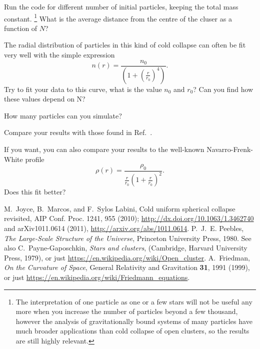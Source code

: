\documentclass[11pt,a4wide]{article}
\begin{document}
\begin{enumerate}
Run the code for different number of initial particles, keeping the
total mass constant. \footnote{The interpretation of one particle as one or a few stars will not be useful any more when you increase the number of particles beyond a few thousand, however the analysis of gravitationally bound systems of many particles have much broader applications than cold collapse of open clusters, so the results are still highly relevant.} What is the average distance from the centre of the cluser as a function of $N$?

The radial distribution of particles in this kind of cold collapse can often be fit very well with the simple expression 
\[ 
n(r) = \frac{n_0}{\left(1 +\left(\frac{r}{r_0}\right)^4\right)}.
\]
Try to fit your data to this curve, what is the value $n_0$ and $r_0$? Can you find how these values depend on N?

How many particles can you simulate?

Compare your results with those found in Ref.~\cite{joyce2010}. 

If you want, you can also compare your results to the well-known Navarro-Frenk-White profile
\[ 
\rho(r) = \frac{\rho_0}{\frac{r}{r_0}\left(1 +\frac{r}{r_0}\right)^2}.
\]
Does this fit better?

\end{enumerate}
\begin{thebibliography}{100} 
 M.~Joyce, B.~Marcos, and F.~Sylos Labini, Cold uniform spherical collapse revisited, AIP Conf. Proc. 1241, 955 (2010); \url{http://dx.doi.org/10.1063/1.3462740} and arXiv1011.0614 (2011), 
\url{http://arxiv.org/abs/1011.0614}.
 P.~J.~E. Peebles, \emph{{The Large-Scale Structure of the Universe}}, Princeton
  University Press, 1980. See also C.~Payne-Gaposchkin,  {\em Stars and clusters}, (Cambridge, Harvard University Press, 1979), or just \url{https://en.wikipedia.org/wiki/Open_cluster}. 
 A.~Friedman,  {\em On the Curvature of Space},  General Relativity and Gravitation {\bf 31},  1991 (1999), or just \url{https://en.wikipedia.org/wiki/Friedmann_equations}.
\end{thebibliography} 
\end{document}

